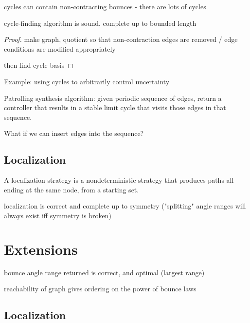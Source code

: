 \documentclass[]{styles/svproc}  %
\begin{document}
\begin{lemma}
cycles can contain non-contracting bounces - there are lots of cycles
\end{lemma}


\begin{theorem}
cycle-finding algorithm is sound, complete up to bounded length
\end{theorem}

\begin{proof}
make graph, quotient so that non-contraction edges are removed / edge conditions
are modified appropriately

then find cycle basis
\end{proof}

Example: using cycles to arbitrarily control uncertainty


Patrolling synthesis algorithm: given periodic sequence of edges, return a controller that
results in a stable limit cycle that visits those edges in that sequence.

What if we can insert edges into the sequence?

\subsection{Localization}

\begin{definition}
A localization strategy is a nondeterministic strategy that produces paths all
ending at the same node, from a starting set.
\end{definition}

\begin{theorem}
localization is correct and complete up to symmetry ("splitting" angle ranges
will always exist iff symmetry is broken)
\end{theorem}


\section{Extensions}

\begin{corollary} bounce angle range returned is correct, and optimal
   (largest range)
\end{corollary}

\begin{theorem}
reachability of graph gives ordering on the power of bounce laws
\end{theorem}

\subsection{Localization}
\end{document}
